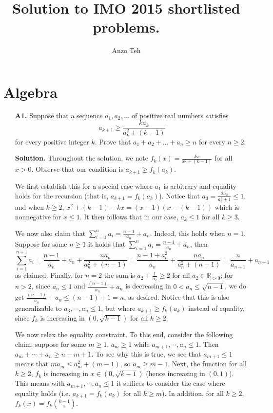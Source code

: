 \documentclass[11pt,a4paper]{article}
\begin{document}
\title{Solution to IMO 2015 shortlisted problems.}
\author{Anzo Teh}
\date{}
\maketitle

\section*{Algebra}
\begin{enumerate}
\item[\textbf{A1.}]
Suppose that a sequence $a_1,a_2,\ldots$ of positive real numbers satisfies\[a_{k+1}\geq\frac{ka_k}{a_k^2+(k-1)}\]for every positive integer $k$. 
Prove that $a_1+a_2+\ldots+a_n\geq n$ for every $n\geq2$.

\textbf{Solution.} 
Throughout the solution, we note $f_k(x) = \frac{kx}{x^2+(k - 1)}$ for all $x > 0$. 
Observe that our condition is $a_{k+1}\ge f_k(a_k)$. 

We first establish this for a special case where $a_1$ is arbitrary and equality holds for the recursion 
(that is, $a_{k+1} = f_k(a_k)$). 
Notice that $a_3 = \frac{2a_2}{a_2^2 + 1}\le 1$, 
and when $k\ge 2$, $x^2 + (k - 1) - kx = (x - 1)(x - (k - 1))$ which is nonnegative for $x\le 1$. 
It then follows that in our case, 
$a_k\le 1$ for all $k\ge 3$. 

We now also claim that $\sum_{i=1}^n a_i = \frac{n-1}{a_n} + a_n$. 
Indeed, this holds when $n = 1$. 
Suppose for some $n\ge 1$ it holds that $\sum_{i=1}^n a_i = \frac{n-1}{a_n} + a_n$, 
then 
\[
\sum_{i=1}^{n+1} a_i 
=\frac{n-1}{a_n} + a_n + \frac{na_n}{a_n^2 + (n - 1)}
=\frac{n-1 + a_n^2}{a_n} + \frac{na_n}{a_n^2 + (n - 1)}
=\frac{n}{a_{n+1}} + a_{n+1}
\]
as claimed. 
Finally, for $n=2$ the sum is $a_2+\frac{1}{a_2}\ge 2$ for all $a_2\in\mathbb{R}_{>0}$; 
for $n > 2$, since $a_n \le 1$ and $\frac{(n - 1)}{a_n} + a_n$ is decreasing in $0<a_n\le \sqrt{n-1}$, 
we do get 
$\frac{(n - 1)}{a_n} + a_n\le (n - 1) + 1 = n$, as desired. 
Notice that this is also generalizable to $a_3, \cdots, a_n\le 1$, but where $a_{k+1}\ge f_k(a_k)$ instead of equality, 
since $f_k$ is increasing in $(0, \sqrt{k-1})$ for all $k\ge 2$. 

We now relax the equality constraint. 
To this end, consider the following claim: 
suppose for some $m\ge 1$, $a_m\ge 1$ while $a_{m+1}, \cdots, a_n\le 1$. 
Then $a_m + \cdots + a_n\ge n - m + 1$. 
To see why this is true, 
we see that $a_{m+1}\le 1$ means that $ma_m\le a_m^2 + (m - 1)$, 
so $a_m\ge m - 1$. 
Next, the function for all $k\ge 2$, $f_k$ is increasing in $x\in (0, \sqrt{k-1})$ (hence increasing in $(0, 1)$). 
This means with $a_{m+1}, \cdots, a_n\le 1$ it suffices to consider the case where equality holds 
(i.e. $a_{k+1}=f_k(a_k)$ for all $k\ge m$). 
In addition, for all $k\ge 2$, $f_k(x)=f_k(\frac{k - 1}{x})$. 


\end{enumerate}
\end{document}
